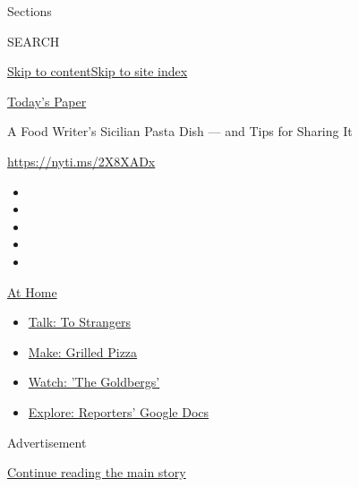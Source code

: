 Sections

SEARCH

\protect\hyperlink{site-content}{Skip to
content}\protect\hyperlink{site-index}{Skip to site index}

\href{https://myaccount.nytimes3xbfgragh.onion/auth/login?response_type=cookie\&client_id=vi}{}

\href{https://www.nytimes3xbfgragh.onion/section/todayspaper}{Today's
Paper}

A Food Writer's Sicilian Pasta Dish --- and Tips for Sharing It

\url{https://nyti.ms/2X8XADx}

\begin{itemize}
\item
\item
\item
\item
\item
\end{itemize}

\href{https://www.nytimes3xbfgragh.onion/spotlight/at-home?action=click\&pgtype=Article\&state=default\&region=TOP_BANNER\&context=at_home_menu}{At
Home}

\begin{itemize}
\tightlist
\item
  \href{https://www.nytimes3xbfgragh.onion/2020/08/03/well/family/the-benefits-of-talking-to-strangers.html?action=click\&pgtype=Article\&state=default\&region=TOP_BANNER\&context=at_home_menu}{Talk:
  To Strangers}
\item
  \href{https://www.nytimes3xbfgragh.onion/2020/08/01/at-home/coronavirus-make-pizza-on-a-grill.html?action=click\&pgtype=Article\&state=default\&region=TOP_BANNER\&context=at_home_menu}{Make:
  Grilled Pizza}
\item
  \href{https://www.nytimes3xbfgragh.onion/2020/07/31/arts/television/goldbergs-abc-stream.html?action=click\&pgtype=Article\&state=default\&region=TOP_BANNER\&context=at_home_menu}{Watch:
  'The Goldbergs'}
\item
  \href{https://www.nytimes3xbfgragh.onion/interactive/2020/at-home/even-more-reporters-editors-diaries-lists-recommendations.html?action=click\&pgtype=Article\&state=default\&region=TOP_BANNER\&context=at_home_menu}{Explore:
  Reporters' Google Docs}
\end{itemize}

Advertisement

\protect\hyperlink{after-top}{Continue reading the main story}

